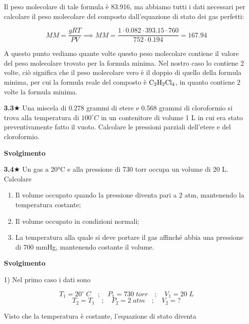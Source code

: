 Il peso molecolare di tale formula è 83.916, ma abbiamo tutti i dati necessari per calcolare il peso molecolare del composto dall'equazione di stato dei gas perfetti:

$$MM=\frac{gRT}{PV} \implies MM=\frac{1 \cdot 0.082 \cdot 393.15 \cdot 760}{752 \cdot 0.194}=167.94$$

A questo punto vediamo quante volte questo peso molecolare contiene il valore del peso molecolare trovato per la formula minima. Nel nostro caso lo contiene 2 volte, ciò significa che il peso molecolare vero è il doppio di quello della formula minima, per cui la formula reale del composto è $\rm C_2H_2Cl_4$, in quanto contiene 2 volte la formula minima.

\vspace{0.2cm}\textbf{3.3}$\bigstar$ Una miscela di 0.278 grammi di etere e 0.568 grammi di cloroformio si trova alla temperatura di $100^{\circ}C$ in un contenitore di volume 1 L in cui era stato preventivamente fatto il vuoto. Calcolare le pressioni parziali dell'etere e del cloroformio.

\vspace{0.2cm}\large\textbf{Svolgimento}\normalsize

\vspace{0.2cm}

\vspace{0.2cm}\textbf{3.4}$\bigstar$ Un gas a 20°C e alla pressione di 730 torr occupa un volume di 20 L. Calcolare

\begin{enumerate}
    \item Il volume occupato quando la pressione diventa pari a 2 atm, mantenendo la temperatura costante;
    \item Il volume occupato in condizioni normali;
    \item La temperatura alla quale si deve portare il gas affinché abbia una pressione di 700 mmHg, mantenendo costante il volume.
\end{enumerate}

\vspace{0.2cm}\large\textbf{Svolgimento}\normalsize

\vspace{0.2cm} 1) Nel primo caso i dati sono

$$T_1=20^{\circ}\;C
\quad;\quad
P_1=730\;torr
\quad;\quad
V_1=20\;L$$
$$T_2=T_1
\quad;\quad
P_2=2\;atm
\quad;\quad
V_2=?$$

Visto che la temperatura è costante, l'equazione di stato diventa


